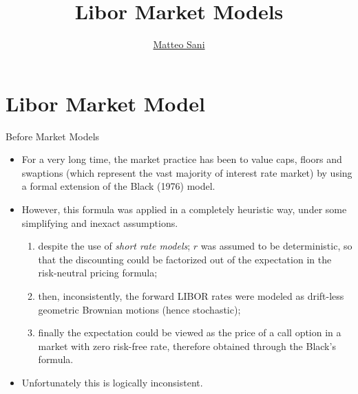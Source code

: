 \documentclass{beamer}
\title{Libor Market Models}
\author{\href{mailto:matteo.sani@unisi.it}{Matteo Sani}}
\begin{document}
\begin{frame}[plain]
  \maketitle
\end{frame}

\section{Libor Market Model}
\begin{frame}{Before Market Models}
  \begin{itemize}
  \item<1-> For a very long time, the market practice has been to value caps, floors and swaptions (which represent the vast majority of interest rate market) by using a formal extension of the Black (1976) model.
  \item<2-> However, this formula was applied in a completely heuristic way, under some simplifying and inexact assumptions.
    \begin{enumerate}
    \item<3-> despite the use of \emph{short rate models}; $r$ was assumed to be deterministic, so that the discounting could be factorized out of the expectation in the risk-neutral pricing formula;
    \item<4-> then, inconsistently, the forward LIBOR rates were modeled as drift-less geometric Brownian motions (hence stochastic);
    \item<5-> finally the expectation could be viewed as the price of a call option in a market with zero risk-free rate, therefore obtained through the Black’s formula.
    \end{enumerate}
  \item<6-> \textcolor{maincolor}{Unfortunately this is logically inconsistent.}
  \end{itemize}
\end{frame}
\end{document}
